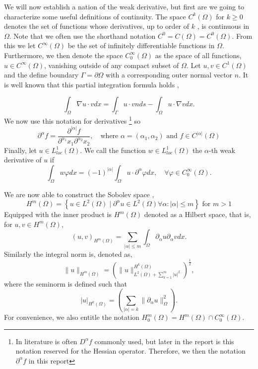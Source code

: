 We will now establish a nation of the weak derivative, but first are we going to characterize some useful definitions of continuity. The space $C^{k}\left( \Omega  \right) $ for $k\ge 0$ denotes the set of functions whose derivatives, up to order of
$k$ , is continuous in $\Omega $. Note that we often use the shorthand notation $ C^{0} = C\left( \Omega  \right)  = C^{0}\left( \Omega  \right) $.
From this we let $C^{\infty}\left( \Omega  \right) $ be the set of infinitely differentiable functions in $\Omega $. Furthermore, we then denote the space $C^{\infty}_{0}\left( \Omega  \right)$ as the space of all functions, $u \in C^{\infty}\left( \Omega
\right) $, vanishing outside of any compact subset of $\Omega $. Let $u,v \in  C^{1}\left( \Omega  \right) $ and the define boundary $\Gamma  = \partial \Omega $ with a corresponding outer normal vector $n$. It is well known that this partial
integration formula holds \cite{manzoni2021optimal},

\[
\int_{\Omega }^{} \nabla u \cdot v dx = \int_{\Gamma }^{} u\cdot v n ds - \int_{\Omega }^{} u \cdot \nabla v dx.
\]
We now use this notation for derivatives
\footnote{In literature is often $D^{\alpha } f$ commonly used, but later in the report is this notation reserved for the Hessian operator. Therefore, we then the notation $\partial ^{\alpha } f$ in this report} so \[
\partial ^{\alpha  } f = \frac{\partial ^{\left\lvert \alpha  \right\rvert } f}{ \partial ^{\alpha _{1} } x_{1} \partial ^{\alpha _{2}} x_{2}  }, \quad \text{where } \alpha=\left( \alpha _{1}, \alpha _{2} \right) \text{ and } f \in C^{\left\lvert \alpha  \right\rvert }
\left( \Omega  \right)
\]
Finally, let $u \in  L^{1}_{loc}\left( \Omega  \right) $. We call the function $w \in L_{loc}^{1}\left( \Omega  \right) $ the $\alpha $-th weak derivative of $u$  if \[
\int_{\Omega }^{} w \varphi  dx = \left( -1 \right) ^{\left\lvert \alpha  \right\rvert } \int_{\Omega }^{} u \cdot \partial ^{\alpha } \varphi dx, \quad \forall \varphi \in  C_{0}^{\infty}\left( \Omega  \right).
\]

We are now able to construct the Sobolev space \cite{manzoni2021optimal}, \[
H^{m}\left( \Omega  \right) = \left\{ u \in L^{2}\left( \Omega  \right)  \mid  \partial ^{\alpha } u \in L^{2}\left( \Omega  \right)  \forall \alpha : \left\lvert \alpha  \right\rvert  \le m \right\} \text{ for } m>1
\]
Equipped with the inner product is $H^{m}\left( \Omega  \right) $  denoted as a Hilbert space, that is, for $u,v \in H^{m}\left( \Omega  \right) $, \[
    \left( u,v \right) _{H^{m}\left( \Omega   \right) } = \sum_{\left\lvert \alpha  \right\rvert  \le  m}^{}  \int_{\Omega }^{} \partial _{\alpha } u \partial _{\alpha } v dx.
\]
Similarly the integral norm is, denoted as, \[
\| u \|_{ H^{m}\left( \Omega  \right)  }^{  }  = \left( \| u \|_{ L^{2}\left( \Omega  \right)  + \sum_{k = 1}^{m}  \left\lvert u \right\rvert ^{2}  }^{  H^{k}\left( \Omega  \right) }  \right) ^{\frac{1}{2}},
\]
where the seminorm is defined such that \[
\left\lvert u \right\rvert _{H^{k}\left( \Omega  \right) } = \left( \sum_{\left\lvert \alpha  \right\rvert  = k}^{} \| \partial _{\alpha }u \|_{ \Omega  }^{ 2 }  \right).
\]
For convenience, we also entitle the notation $H^{m}_{0} \left( \Omega  \right) = H^{m} \left( \Omega  \right) \cap C^{\infty}_{0} \left( \Omega  \right) $.


